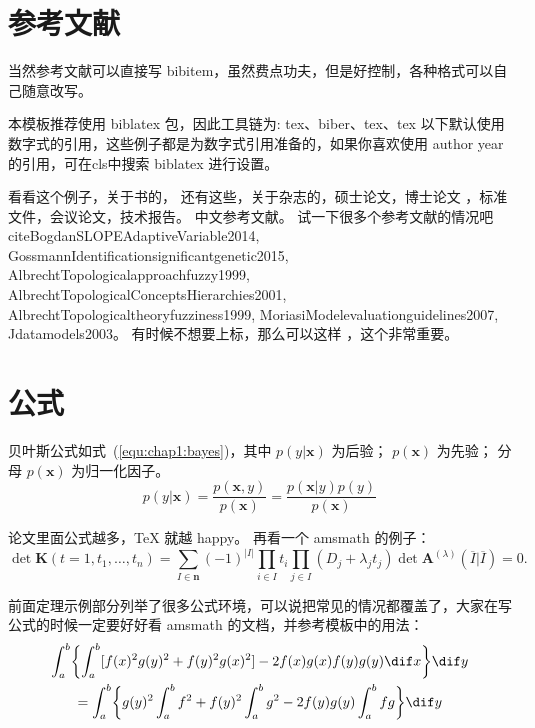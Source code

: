 \documentclass[../Main/thesis.tex]{subfiles}
\begin{document}
\section{参考文献}
\label{sec:bib}
当然参考文献可以直接写 bibitem，虽然费点功夫，但是好控制，各种格式可以自己随意改写。

本模板推荐使用 biblatex 包，因此工具链为: tex、biber、tex、tex 以下默认使用数字式的引用，这些例子都是为数字式引用准备的，如果你喜欢使用 author year 的引用，可在cls中搜索 biblatex 进行设置。

看看这个例子，关于书的\cite{tex, companion,ColdSources}， 还有这些\cite{Krasnogor2004e, clzs, zjsw}，关于杂志的\cite{ELIDRISSI94, MELLINGER96, SHELL02}，硕士论文\cite{zhubajie, metamori2004}，博士论文 \cite{shaheshang, FistSystem01}，标准文件\cite{IEEE-1363}，会议论文\cite{DPMG,kocher99}，技术报告\cite{NPB2}。
中文参考文献\cite{cnarticle}。
试一下很多个参考文献的情况吧
cite{BogdanSLOPEAdaptiveVariable2014, GossmannIdentificationsignificantgenetic2015, AlbrechtTopologicalapproachfuzzy1999, AlbrechtTopologicalConceptsHierarchies2001, AlbrechtTopologicaltheoryfuzziness1999, MoriasiModelevaluationguidelines2007, Jdatamodels2003}。
有时候不想要上标，那么可以这样 \parencite{shaheshang}，这个非常重要。

\section{公式}
\label{sec:equation}
贝叶斯公式如式~(\ref{equ:chap1:bayes})，其中 $p(y|\mathbf{x})$ 为后验；
$p(\mathbf{x})$ 为先验；
分母 $p(\mathbf{x})$ 为归一化因子。
\begin{equation}
  \label{equ:chap1:bayes}
  p(y|\mathbf{x}) = \frac{p(\mathbf{x},y)}{p(\mathbf{x})}=
  \frac{p(\mathbf{x}|y)p(y)}{p(\mathbf{x})}
\end{equation}

论文里面公式越多，\TeX{} 就越 happy。
再看一个 \textsf{amsmath} 的例子：
\newcommand{\envert}[1]{\left\lvert#1\right\rvert}
\begin{equation}\label{detK2}
  \det\mathbf{K}(t=1,t_1,\dots,t_n)=\sum_{I\in\mathbf{n}}(-1)^{\envert{I}}
  \prod_{i\in I}t_i\prod_{j\in I}(D_j+\lambda_jt_j)\det\mathbf{A}
  ^{(\lambda)}(\overline{I}|\overline{I})=0.
\end{equation}

前面定理示例部分列举了很多公式环境，可以说把常见的情况都覆盖了，大家在写公式的时候一定要好好看 \textsf{amsmath} 的文档，并参考模板中的用法：
\begin{multline*}%
  \int_a^b\biggl\{\int_a^b[f(x)^2g(y)^2+f(y)^2g(x)^2]
  -2f(x)g(x)f(y)g(y)\dif x\biggr\}\dif y \\
  =\int_a^b\biggl\{g(y)^2\int_a^bf^2+f(y)^2
  \int_a^b g^2-2f(y)g(y)\int_a^b fg\biggr\}\dif y
\end{multline*}
\end{document}
